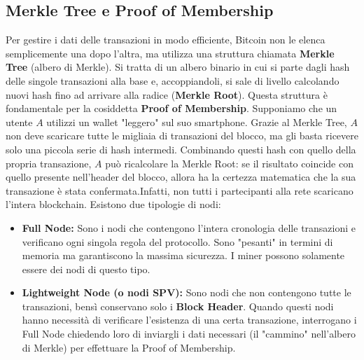 \subsection{Merkle Tree e Proof of Membership}
Per gestire i dati delle transazioni in modo efficiente, Bitcoin non le elenca semplicemente una dopo l'altra, ma utilizza una struttura chiamata \textbf{Merkle Tree} (albero di Merkle). Si tratta di un albero binario in cui si parte dagli hash delle singole transazioni alla base e, accoppiandoli, si sale di livello calcolando nuovi hash fino ad arrivare alla radice (\textbf{Merkle Root}).
Questa struttura è fondamentale per la cosiddetta \textbf{Proof of Membership}. Supponiamo che un utente $A$ utilizzi un wallet "leggero" sul suo smartphone. Grazie al Merkle Tree, $A$ non deve scaricare tutte le migliaia di transazioni del blocco, ma gli basta ricevere solo una piccola serie di hash intermedi. Combinando questi hash con quello della propria transazione, $A$ può ricalcolare la Merkle Root: se il risultato coincide con quello presente nell'header del blocco, allora ha la certezza matematica che la sua transazione è stata confermata.Infatti, non tutti i partecipanti alla rete scaricano l'intera blockchain. Esistono due tipologie di nodi:
\begin{itemize}
    \item \textbf{Full Node:} Sono i nodi che contengono l'intera cronologia delle transazioni e verificano ogni singola regola del protocollo. Sono "pesanti" in termini di memoria ma garantiscono la massima sicurezza. I miner possono solamente essere dei nodi di questo tipo.
    \item \textbf{Lightweight Node (o nodi SPV):} Sono nodi che non contengono tutte le transazioni, bensì conservano solo i \textbf{Block Header}. Quando questi nodi hanno necessità di verificare l'esistenza di una certa transazione, interrogano i Full Node chiedendo loro di inviargli i dati necessari (il "cammino" nell'albero di Merkle) per effettuare la Proof of Membership.
\end{itemize}
